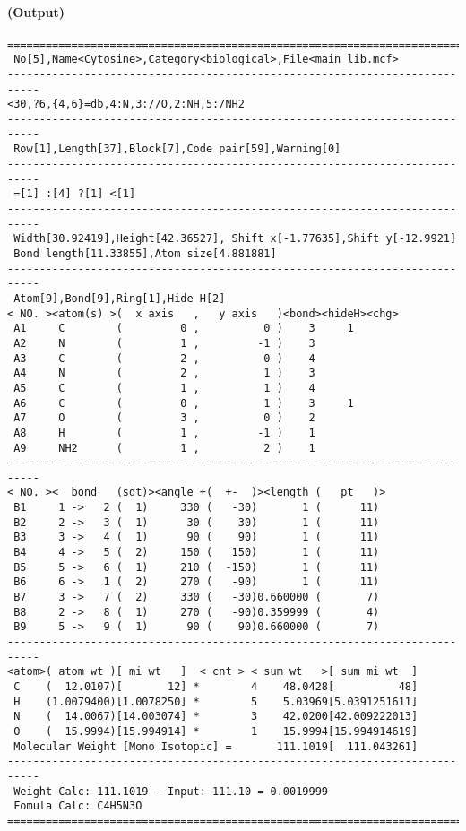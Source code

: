 \documentclass[a4paper]{article}
\begin{document}
\paragraph{(Output)}
\begin{verbatim}
===========================================================================
 No[5],Name<Cytosine>,Category<biological>,File<main_lib.mcf>
---------------------------------------------------------------------------
<30,?6,{4,6}=db,4:N,3://O,2:NH,5:/NH2
---------------------------------------------------------------------------
 Row[1],Length[37],Block[7],Code pair[59],Warning[0]
---------------------------------------------------------------------------
 =[1] :[4] ?[1] <[1]
---------------------------------------------------------------------------
 Width[30.92419],Height[42.36527], Shift x[-1.77635],Shift y[-12.9921]
 Bond length[11.33855],Atom size[4.881881]
---------------------------------------------------------------------------
 Atom[9],Bond[9],Ring[1],Hide H[2]
< NO. ><atom(s) >(  x axis   ,   y axis   )<bond><hideH><chg>
 A1     C        (         0 ,          0 )    3     1
 A2     N        (         1 ,         -1 )    3        
 A3     C        (         2 ,          0 )    4        
 A4     N        (         2 ,          1 )    3        
 A5     C        (         1 ,          1 )    4        
 A6     C        (         0 ,          1 )    3     1
 A7     O        (         3 ,          0 )    2        
 A8     H        (         1 ,         -1 )    1        
 A9     NH2      (         1 ,          2 )    1        
---------------------------------------------------------------------------
< NO. ><  bond   (sdt)><angle +(  +-  )><length (   pt   )>
 B1     1 ->   2 (  1)     330 (   -30)       1 (      11)
 B2     2 ->   3 (  1)      30 (    30)       1 (      11)
 B3     3 ->   4 (  1)      90 (    90)       1 (      11)
 B4     4 ->   5 (  2)     150 (   150)       1 (      11)
 B5     5 ->   6 (  1)     210 (  -150)       1 (      11)
 B6     6 ->   1 (  2)     270 (   -90)       1 (      11)
 B7     3 ->   7 (  2)     330 (   -30)0.660000 (       7)
 B8     2 ->   8 (  1)     270 (   -90)0.359999 (       4)
 B9     5 ->   9 (  1)      90 (    90)0.660000 (       7)
---------------------------------------------------------------------------
<atom>( atom wt )[ mi wt   ]  < cnt > < sum wt   >[ sum mi wt  ]
 C    (  12.0107)[       12] *        4    48.0428[          48]
 H    (1.0079400)[1.0078250] *        5    5.03969[5.0391251611]
 N    (  14.0067)[14.003074] *        3    42.0200[42.009222013]
 O    (  15.9994)[15.994914] *        1    15.9994[15.994914619]
 Molecular Weight [Mono Isotopic] =       111.1019[  111.043261]
---------------------------------------------------------------------------
 Weight Calc: 111.1019 - Input: 111.10 = 0.0019999
 Fomula Calc: C4H5N3O
===========================================================================
\end{verbatim}
\newpage
\noindent%
\end{document}
